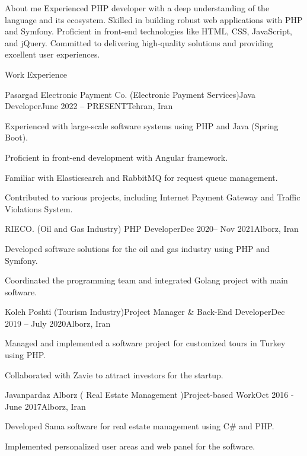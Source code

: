 \documentclass[]{kyvernitis-resume}
\begin{document}
\resumeheader
{}
{}
{}
{}
{\address{Karaj, Alborz Province, Iran}}
{}

\begin{section}{About me}
Experienced PHP developer with a deep understanding of the language and its ecosystem. Skilled in building robust web applications with PHP and Symfony. Proficient in front-end technologies like HTML, CSS, JavaScript, and jQuery. Committed to delivering high-quality solutions and providing excellent user experiences.
\end{section}

\begin{section}{Work Experience}
\begin{subsection}{Pasargad Electronic Payment Co. (Electronic Payment Services)}{Java Developer}{June 2022 -- PRESENT}{Tehran, Iran}
\item Experienced with large-scale software systems using PHP and Java (Spring Boot).
\item Proficient in front-end development with Angular framework.
\item Familiar with Elasticsearch and RabbitMQ for request queue management.
\item Contributed to various projects, including Internet Payment Gateway and Traffic Violations System.
\end{subsection}

\begin{subsection}{RIECO.  (Oil and Gas Industry) }{PHP Developer}{Dec 2020-- Nov 2021}{Alborz, Iran}
   	\item Developed software solutions for the oil and gas industry using PHP and Symfony.
\item Coordinated the programming team and integrated Golang project with main software.
\end{subsection}

\begin{subsection}{Koleh Poshti  (Tourism Industry)}{Project Manager \& Back-End Developer}{Dec 2019 -- July 2020}{Alborz, Iran}
\item Managed and implemented a software project for customized tours in Turkey using PHP.
\item Collaborated with Zavie to attract investors for the startup.
\end{subsection}

\begin{subsection}{Javanpardaz Alborz ( Real Estate Management )}{Project-based Work}{Oct 2016 - June 2017}{Alborz, Iran}
\item Developed Sama software for real estate management using C\# and PHP.
\item Implemented personalized user areas and web panel for the software.
\end{subsection}



\end{section}
\end{document}
